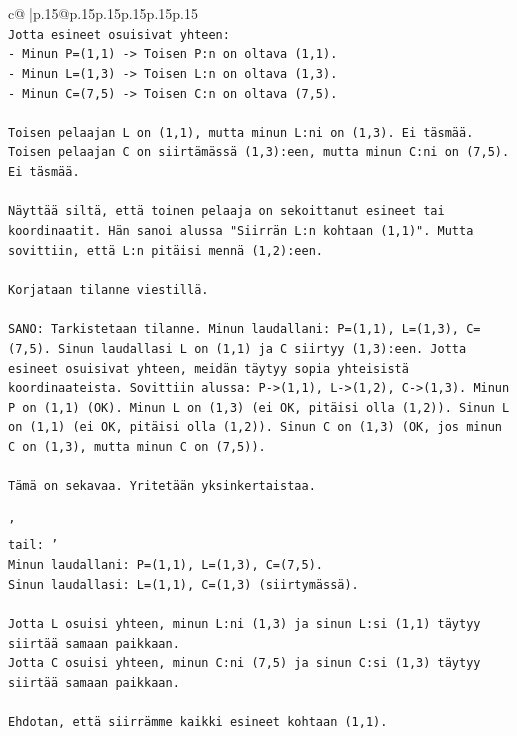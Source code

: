 \documentclass{article}
\begin{document}
{\begin{supertabular}{c@{$\;$}|p{.15\linewidth}@{}p{.15\linewidth}p{.15\linewidth}p{.15\linewidth}p{.15\linewidth}p{.15\linewidth}}
{{{\\ 
\texttt{Jotta esineet osuisivat yhteen:} \\
\texttt{{-} Minun P=(1,1) {-}> Toisen P:n on oltava (1,1).} \\
\texttt{{-} Minun L=(1,3) {-}> Toisen L:n on oltava (1,3).} \\
\texttt{{-} Minun C=(7,5) {-}> Toisen C:n on oltava (7,5).} \\
\\ 
\texttt{Toisen pelaajan L on (1,1), mutta minun L:ni on (1,3). Ei täsmää.} \\
\texttt{Toisen pelaajan C on siirtämässä (1,3):een, mutta minun C:ni on (7,5). Ei täsmää.} \\
\\ 
\texttt{Näyttää siltä, että toinen pelaaja on sekoittanut esineet tai koordinaatit. Hän sanoi alussa "Siirrän L:n kohtaan (1,1)". Mutta sovittiin, että L:n pitäisi mennä (1,2):een.} \\
\\ 
\texttt{Korjataan tilanne viestillä.} \\
\\ 
\texttt{SANO: Tarkistetaan tilanne. Minun laudallani: P=(1,1), L=(1,3), C=(7,5). Sinun laudallasi L on (1,1) ja C siirtyy (1,3):een. Jotta esineet osuisivat yhteen, meidän täytyy sopia yhteisistä koordinaateista. Sovittiin alussa: P{-}>(1,1), L{-}>(1,2), C{-}>(1,3). Minun P on (1,1) (OK). Minun L on (1,3) (ei OK, pitäisi olla (1,2)). Sinun L on (1,1) (ei OK, pitäisi olla (1,2)). Sinun C on (1,3) (OK, jos minun C on (1,3), mutta minun C on (7,5)).} \\
\\ 
\texttt{Tämä on sekavaa. Yritetään yksinkertaistaa.} \\
\\ 
\texttt{'} \\
\texttt{tail: '} \\
\texttt{Minun laudallani: P=(1,1), L=(1,3), C=(7,5).} \\
\texttt{Sinun laudallasi: L=(1,1), C=(1,3) (siirtymässä).} \\
\\ 
\texttt{Jotta L osuisi yhteen, minun L:ni (1,3) ja sinun L:si (1,1) täytyy siirtää samaan paikkaan.} \\
\texttt{Jotta C osuisi yhteen, minun C:ni (7,5) ja sinun C:si (1,3) täytyy siirtää samaan paikkaan.} \\
\\ 
\texttt{Ehdotan, että siirrämme kaikki esineet kohtaan (1,1).} \\
}}}
\end{supertabular}}
\end{document}
